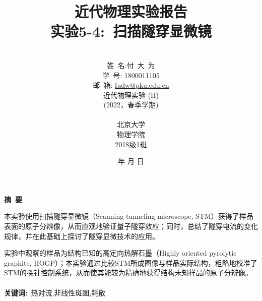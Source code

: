\documentclass[a4paper]{article}
\begin{document}
\renewcommand{\contentsname}{目\ 录}
\renewcommand{\appendixname}{附录}
\renewcommand{\appendixpagename}{附录}
\renewcommand{\refname}{参考文献} 
\renewcommand{\figurename}{图}
\renewcommand{\tablename}{表}
\renewcommand{\today}{\number\year 年 \number\month 月 \number\day 日}
\newcommand{\refeq}[1]{\textbf{Eq.(\ref{#1})}}
\newcommand*{\circled}[1]{\lower.7ex\hbox{\tikz\draw (0pt, 0pt)%
    circle (.5em) node {\makebox[1em][c]{\small #1}};}}
    
\title{{\Huge 近代物理实验报告{\large\linebreak\\}}{\Large 实验5-4:\ 扫描隧穿显微镜\linebreak\linebreak}}
\author{\\姓\ 名:付\ 大\ 为\\
学\ 号: 1800011105\\
邮\ 箱: \url{fudw@pku.edu.cn}\\
近代物理实验 (II)\\
(2022，春季学期)\\\\
北京大学\\
物理学院\\
2018级1班}
\date{\today}
\maketitle
\newpage

\begin{center}
{\Large\bf{摘\ 要\\}}
\end{center}

本实验使用扫描隧穿显微镜（Scanning tunneling microscope, STM）获得了样品表面的原子分辨像，从而直观地验证量子隧穿效应；同时，总结了隧穿电流的变化规律，并在此基础上探讨了隧穿显微技术的应用。

实验中观察的样品为结构已知的高定向热解石墨（Highly oriented pyrolytic graphite, HOGP）；本实验通过比较STM所成图像与样品实际结构，粗略地校准了STM的探针控制系统，从而使其能较为精确地获得结构未知样品的原子分辨像。
\\\\
{\bf{关键词}:}\ 热对流,非线性斑图,耗散
\end{document}
